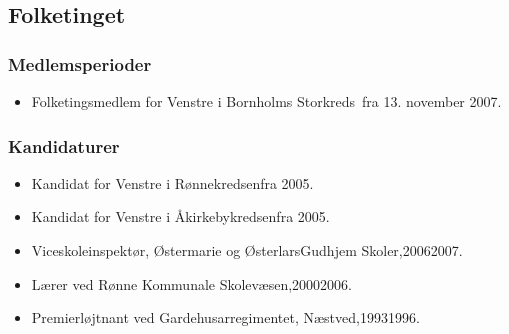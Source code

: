 \documentclass[11pt, a4paper]{awesome-cv}
\begin{document}
\begin{cvletter}
\subsection*{Folketinget}
\subsubsection*{Medlemsperioder}
\begin{itemize}
\item Folketingsmedlem for Venstre i Bornholms Storkreds fra 13. november 2007.
\end{itemize}
\subsubsection*{Kandidaturer}
\begin{itemize}
\item Kandidat for Venstre i Rønnekredsenfra 2005.
\item Kandidat for Venstre i Åkirkebykredsenfra 2005.
\end{itemize}
\begin{itemize}
\item Viceskoleinspektør, Østermarie og ØsterlarsGudhjem Skoler,20062007.
\item Lærer ved Rønne Kommunale Skolevæsen,20002006.
\item Premierløjtnant ved Gardehusarregimentet, Næstved,19931996.
\end{itemize}
\end{cvletter}
\end{document}
